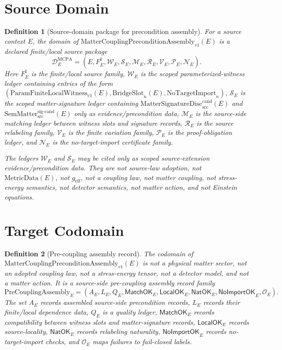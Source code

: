 \documentclass[11pt]{article}
\newcommand{\MetricData}{\mathrm{MetricData}}
\newcommand{\geff}{g_{\mathrm{eff}}}
\newcommand{\SemMatterSig}{\mathrm{SemMatter}_{\mathrm{src}}^{\mathrm{sig\text{-}cand}}}
\newcommand{\MatSigDisc}{\mathrm{MatterSignatureDisc}_{\mathrm{src}}^{\mathrm{cand}}}
\newcommand{\ParamWitness}{\mathrm{ParamFiniteLocalWitness}_{v1}}
\newcommand{\BridgeSlot}{\mathrm{BridgeSlot}}
\newcommand{\NoTargetImport}{\mathrm{NoTargetImport}}
\newcommand{\MCPA}{\mathrm{MatterCouplingPreconditionAssembly}_{v1}}
\newcommand{\PreCoupAsm}{\mathrm{PreCouplingAssembly}}
\newtheorem{definition}{Definition}
\begin{document}
\section{Source Domain}

\begin{definition}[Source-domain package for precondition assembly]
For a source context \(E\), the domain of \(\MCPA(E)\) is a declared
finite/local source package
\[
  \mathcal{D}^{\mathrm{MCPA}}_E =
  (E,F_E^\sharp,\mathcal{W}_E,\mathcal{S}_E,\mathcal{M}_E,
  \mathcal{R}_E,\mathcal{V}_E,\mathcal{P}_E,\mathcal{N}_E).
\]
Here \(F_E^\sharp\) is the finite/local source family,
\(\mathcal{W}_E\) is the scoped parameterized-witness ledger containing
entries of the form \((\ParamWitness(E),\BridgeSlot_n(E),
\NoTargetImport_n)\), \(\mathcal{S}_E\) is the scoped
matter-signature ledger containing \(\MatSigDisc(E)\) and
\(\SemMatterSig(E)\) only as evidence/precondition data,
\(\mathcal{M}_E\) is the source-side matching ledger between witness slots
and signature records, \(\mathcal{R}_E\) is the source relabeling family,
\(\mathcal{V}_E\) is the finite variation family, \(\mathcal{P}_E\) is the
proof-obligation ledger, and \(\mathcal{N}_E\) is the no-target-import
certificate family.

The ledgers \(\mathcal{W}_E\) and \(\mathcal{S}_E\) may be cited only as
scoped source-extension evidence/precondition data. They are not source-law
adoption, not \(\MetricData(E)\), not \(\geff\), not a coupling law, not
matter coupling, not stress-energy semantics, not detector semantics, not
matter action, and not Einstein equations.
\end{definition}

\section{Target Codomain}

\begin{definition}[Pre-coupling assembly record]
The codomain of \(\MCPA(E)\) is not a physical matter sector, not an adopted
coupling law, not a stress-energy tensor, not a detector model, and not a
matter action. It is a source-side pre-coupling assembly record family
\[
  \PreCoupAsm_E =
  (A_E,L_E,Q_E,\mathsf{MatchOK}_E,\mathsf{LocalOK}_E,
  \mathsf{NatOK}_E,\mathsf{NoImportOK}_E,\mathcal{O}_E).
\]
The set \(A_E\) records assembled source-side precondition records, \(L_E\)
records their finite/local dependence data, \(Q_E\) is a quality ledger,
\(\mathsf{MatchOK}_E\) records compatibility between witness slots and
matter-signature records, \(\mathsf{LocalOK}_E\) records source-locality,
\(\mathsf{NatOK}_E\) records relabeling naturality,
\(\mathsf{NoImportOK}_E\) records no-target-import checks, and
\(\mathcal{O}_E\) maps failures to fail-closed labels.
\end{definition}
\end{document}
